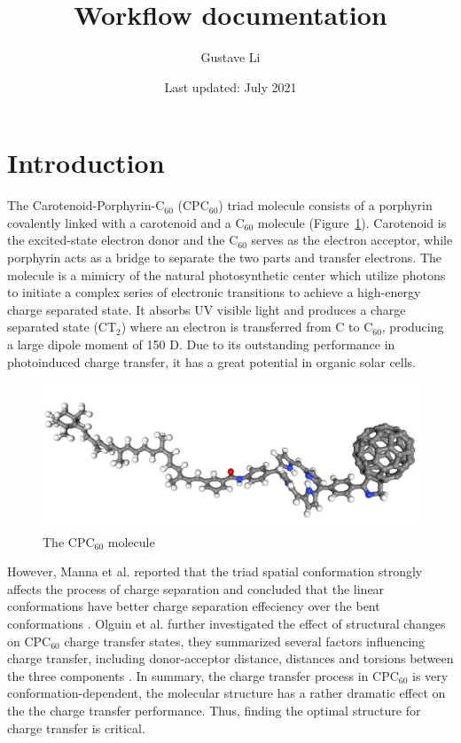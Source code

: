\documentclass[a4paper]{article}
\title{Workflow documentation}
\author{Gustave Li}
\date{Last updated: July 2021}
\begin{document}
\maketitle

\section{Introduction}
The Carotenoid-Porphyrin-\(\text{C}_{60}\) (\(\text{CPC}_{60}\)) triad molecule consists of a porphyrin covalently linked with a carotenoid and a \(\text{C}_{60}\) molecule (Figure~\ref{fig:CPC60}). Carotenoid is the excited-state electron donor and the \(\text{C}_{60}\) serves as the electron acceptor, while porphyrin acts as a bridge to separate the two parts and transfer electrons. The molecule is a mimicry of the natural photosynthetic center which utilize photons to initiate a complex series of electronic transitions to achieve a high-energy charge separated state. It absorbs UV visible light and produces a charge separated state (\(\text{CT}_{2}\)) where an electron is transferred from C to \(\text{C}_{60}\), producing a large dipole moment of 150 D. Due to its outstanding performance in photoinduced charge transfer, it has a great potential in organic solar cells.

\begin{figure}[H]
    \centering
    \includegraphics[width=0.75\linewidth]{projects/Gustave_Li/Docs/Triad.png}
    \caption{The \(\text{CPC}_{60}\) molecule}
    \label{fig:CPC60}
\end{figure}

However, Manna et al. reported that the triad spatial conformation strongly affects the process of charge separation and concluded that the linear conformations have better charge separation effeciency over the bent conformations \cite{MannaArun}. Olguin et al. further investigated the effect of structural changes on \(\text{CPC}_{60}\) charge transfer states, they summarized several factors influencing charge transfer, including donor-acceptor distance, distances and torsions between the three components \cite{OlguinMarco}. In summary, the charge transfer process in \(\text{CPC}_{60}\) is very conformation-dependent,  the molecular structure has a rather dramatic effect on the the charge transfer performance. Thus, finding the optimal structure for charge transfer is critical.
\end{document}
